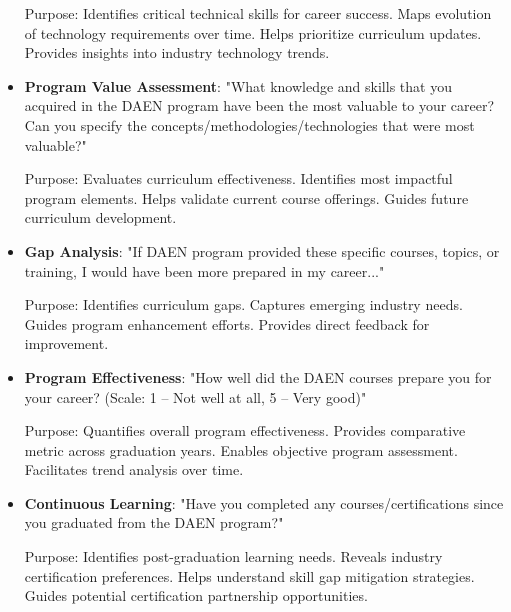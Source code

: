 \documentclass[12pt,a4paper]{article}
\begin{document}
\begin{itemize}
Purpose: Identifies critical technical skills for career success. Maps evolution of technology requirements over time. Helps prioritize curriculum updates. Provides insights into industry technology trends.


\item \textbf{Program Value Assessment}: "What knowledge and skills that you acquired in the DAEN program have been the most valuable to your career? Can you specify the concepts/methodologies/technologies that were most valuable?"

Purpose: Evaluates curriculum effectiveness. Identifies most impactful program elements. Helps validate current course offerings. Guides future curriculum development.


\item \textbf{Gap Analysis}: "If DAEN program provided these specific courses, topics, or training, I would have been more prepared in my career..."

Purpose: Identifies curriculum gaps. Captures emerging industry needs. Guides program enhancement efforts. Provides direct feedback for improvement.


\item \textbf{Program Effectiveness}: "How well did the DAEN courses prepare you for your career? (Scale: 1 -- Not well at all, 5 -- Very good)"

Purpose: Quantifies overall program effectiveness. Provides comparative metric across graduation years. Enables objective program assessment. Facilitates trend analysis over time.


\item \textbf{Continuous Learning}: "Have you completed any courses/certifications since you graduated from the DAEN program?"

Purpose: Identifies post-graduation learning needs. Reveals industry certification preferences. Helps understand skill gap mitigation strategies. Guides potential certification partnership opportunities.
\end{itemize}
\end{document}
